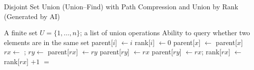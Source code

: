 \begin{algorithm}[H]
    \caption{Disjoint Set Union (Union--Find) with Path Compression and Union by Rank (Generated by AI)}
    \label{algo:dsu}
    \begin{algorithmic}[1]
      \Require A finite set $U = \{1,\dots,n\}$; a list of union operations
      \Ensure Ability to query whether two elements are in the same set
      \Statex
          \State parent[$i$] $\gets i$
          \State rank[$i$] $\gets 0$
        \EndFor
      \EndFunction
      \Statex
          \State parent[$x$] $\gets$  
        \EndIf
        \State \Return parent[$x$]
      \EndFunction
      \Statex
        \State $rx \gets$ ; \quad $ry \gets$ 
         \State \Return \EndIf
          \State parent[$rx$] $\gets ry$
          \State parent[$ry$] $\gets rx$
        \Else
          \State parent[$ry$] $\gets rx$; \quad rank[$rx$] $\gets$ rank[$rx$] $+ 1$
        \EndIf
      \EndFunction
      \Statex
        \State \Return {} $=$ 
      \EndFunction
    \end{algorithmic}
  \end{algorithm}
  